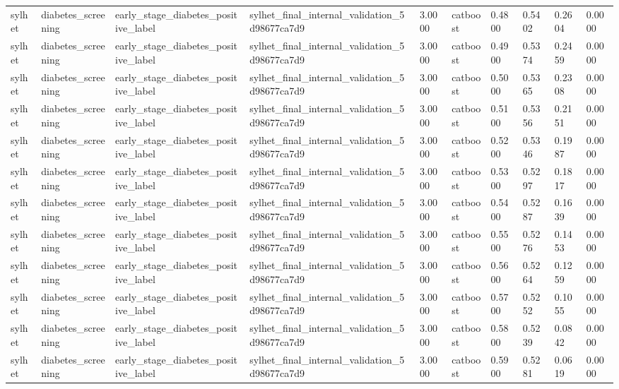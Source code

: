 \begin{tabular}{llllllllll}
sylhet & diabetes\_screening & early\_stage\_diabetes\_positive\_label & sylhet\_final\_internal\_validation\_5d98677ca7d9 & 3.0000 & catboost & 0.4800 & 0.5402 & 0.2604 & 0.0000 \\
sylhet & diabetes\_screening & early\_stage\_diabetes\_positive\_label & sylhet\_final\_internal\_validation\_5d98677ca7d9 & 3.0000 & catboost & 0.4900 & 0.5374 & 0.2459 & 0.0000 \\
sylhet & diabetes\_screening & early\_stage\_diabetes\_positive\_label & sylhet\_final\_internal\_validation\_5d98677ca7d9 & 3.0000 & catboost & 0.5000 & 0.5365 & 0.2308 & 0.0000 \\
sylhet & diabetes\_screening & early\_stage\_diabetes\_positive\_label & sylhet\_final\_internal\_validation\_5d98677ca7d9 & 3.0000 & catboost & 0.5100 & 0.5356 & 0.2151 & 0.0000 \\
sylhet & diabetes\_screening & early\_stage\_diabetes\_positive\_label & sylhet\_final\_internal\_validation\_5d98677ca7d9 & 3.0000 & catboost & 0.5200 & 0.5346 & 0.1987 & 0.0000 \\
sylhet & diabetes\_screening & early\_stage\_diabetes\_positive\_label & sylhet\_final\_internal\_validation\_5d98677ca7d9 & 3.0000 & catboost & 0.5300 & 0.5297 & 0.1817 & 0.0000 \\
sylhet & diabetes\_screening & early\_stage\_diabetes\_positive\_label & sylhet\_final\_internal\_validation\_5d98677ca7d9 & 3.0000 & catboost & 0.5400 & 0.5287 & 0.1639 & 0.0000 \\
sylhet & diabetes\_screening & early\_stage\_diabetes\_positive\_label & sylhet\_final\_internal\_validation\_5d98677ca7d9 & 3.0000 & catboost & 0.5500 & 0.5276 & 0.1453 & 0.0000 \\
sylhet & diabetes\_screening & early\_stage\_diabetes\_positive\_label & sylhet\_final\_internal\_validation\_5d98677ca7d9 & 3.0000 & catboost & 0.5600 & 0.5264 & 0.1259 & 0.0000 \\
sylhet & diabetes\_screening & early\_stage\_diabetes\_positive\_label & sylhet\_final\_internal\_validation\_5d98677ca7d9 & 3.0000 & catboost & 0.5700 & 0.5252 & 0.1055 & 0.0000 \\
sylhet & diabetes\_screening & early\_stage\_diabetes\_positive\_label & sylhet\_final\_internal\_validation\_5d98677ca7d9 & 3.0000 & catboost & 0.5800 & 0.5239 & 0.0842 & 0.0000 \\
sylhet & diabetes\_screening & early\_stage\_diabetes\_positive\_label & sylhet\_final\_internal\_validation\_5d98677ca7d9 & 3.0000 & catboost & 0.5900 & 0.5281 & 0.0619 & 0.0000 \\

\end{tabular}
